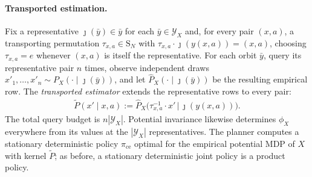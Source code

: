 \documentclass{article}
\theoremstyle{plain}
\theoremstyle{definition}
\theoremstyle{remark}
\newcommand{\abs}[1]{\left\lvert#1\right\rvert}
\newcommand{\Sym}{\mathrm{S}}
\newcommand{\trP}{\widetilde{P}}
\begin{document}
\paragraph{Transported estimation.}
Fix a representative $\jmath(\bar y)\in\bar y$ for each
$\bar y\in\mathcal Y_X$ and, for every pair $(x,a)$, a transporting
permutation $\tau_{x,a}\in\Sym_N$ with
$\tau_{x,a}\mathbin{\cdot}\jmath(y(x,a))=(x,a)$, choosing
$\tau_{x,a}=e$ whenever $(x,a)$ is itself the representative. For each orbit
$\bar y$, query its representative pair $n$ times, observe independent draws
$x'_1,\ldots,x'_n\sim P_X(\cdot\mid\jmath(\bar y))$, and let
$\widehat{P}_X(\cdot\mid\jmath(\bar y))$ be the resulting empirical row. The
\emph{transported estimator} extends the representative rows to every pair:
\begin{align}
  \trP(x'\mid x,a)
  :=
  \widehat{P}_X\big(
    \tau_{x,a}^{-1}\mathbin{\cdot}x'
    \,\big|\,
    \jmath(y(x,a))
  \big).
  \label{eq:transported-estimator}
\end{align}
The total query budget is $n\abs{\mathcal Y_X}$. Potential invariance likewise
determines $\phi_X$ everywhere from its values at the $\abs{\mathcal Y_X}$
representatives. The planner computes a stationary deterministic policy
$\pi_{\mathrm{ce}}$ optimal for the empirical potential MDP of $X$ with kernel
$\trP$; as before, a stationary deterministic joint policy is a product
policy.
\end{document}
